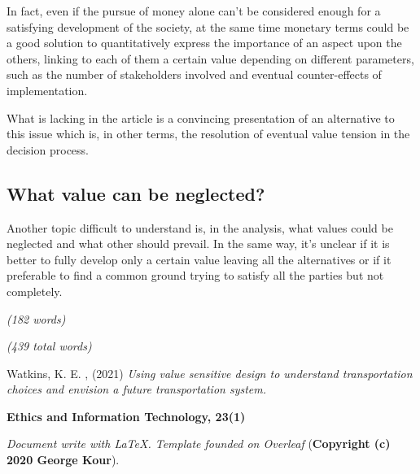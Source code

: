 In fact, even if the pursue of money alone can’t be considered enough for a satisfying development of the society, at the same time monetary terms could be a good solution to quantitatively express the importance of an aspect upon the others, linking to each of them a certain value depending on different parameters, such as the number of stakeholders involved and eventual counter-effects of implementation.

What is lacking in the article is a convincing presentation of an alternative to this issue which is, in other terms, the resolution of eventual value tension in the decision process.

\subsection{What value can be neglected?}
Another topic difficult to understand is, in the analysis, what values could be neglected and what other should prevail. In the same way, it’s unclear if it is better to fully develop only a certain value leaving all the alternatives or if it preferable to find a common ground trying to satisfy all the parties but not completely.

\emph{(182 words)}

\emph{(439 total words)}

\newpage
\begin{thebibliography}{99}

Watkins, K. E. , (2021)
\textit{Using value sensitive design to understand transportation choices and envision a future transportation system.}

\textbf{Ethics and Information Technology, 23(1)}

\end{thebibliography}

\textit{Document write with \LaTeX. Template founded on Overleaf} (\textbf{Copyright (c) 2020 George Kour}).